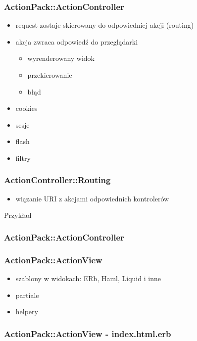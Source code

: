 \documentclass[12t]{beamer}
\begin{document}
\begin{frame}
  \frametitle{ActionPack::ActionController}
  \begin{itemize}
  \item request zostaje skierowany do odpowiedniej akcji (routing)
  \item akcja zwraca odpowiedź do przeglądarki
    \begin{itemize}
    \item wyrenderowany widok
    \item przekierowanie
    \item błąd
    \end{itemize}
  \item cookies
  \item sesje
  \item flash
  \item filtry
  \end{itemize}
\end{frame}

\begin{frame}
  \frametitle{ActionController::Routing}
  \begin{itemize}
  \item wiązanie URI z akcjami odpowiednich kontrolerów
  \end{itemize}
  \begin{block}{Przykład}
    
  \end{block}
\end{frame}

\begin{frame}
  \frametitle{ActionPack::ActionController}
  \begin{small}
  
  \end{small}
\end{frame}

\begin{frame}
  \frametitle{ActionPack::ActionView}
  \begin{itemize}
  \item szablony w widokach: ERb, Haml, Liquid i inne
  \item partiale
  \item helpery
  \end{itemize}
\end{frame}

\begin{frame}[fragile]
  \frametitle{ActionPack::ActionView - index.html.erb}
  
\end{frame}
\end{document}
